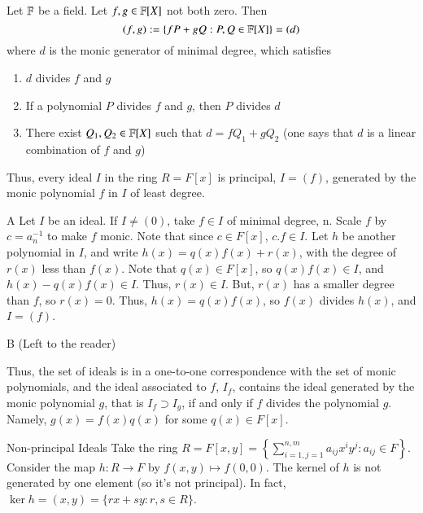 \documentclass[12pt, a4paper, twoside, openright, titlepage]{book}
\begin{document}
\begin{cor}{}{}
    Let $\mathbb F$ be a field. Let $f,g \in \mathbb F[X]$ not both zero. Then \begin{equation}
        (f,g) := \{fP+gQ: P,Q\in\mathbb F[X]\} = (d)
    \end{equation}
    where $d$ is the monic generator of minimal degree, which satisfies \begin{enumerate}
        \item $d$ divides $f$ and $g$
        \item If a polynomial $P$ divides $f$ and $g$, then $P$ divides $d$
        \item There exist $Q_1, Q_2 \in \mathbb F[X]$ such that $d = fQ_1 + gQ_2$ (one says that $d$ is a linear combination of $f$ and $g$)
    \end{enumerate}
    Thus, every ideal $I$ in the ring $R = F[x]$ is principal, $I = (f)$, generated by the monic polynomial $f$ in $I$ of least degree.
    \begin{prooflab*}{A}
        Let $I$ be an ideal. If $I \neq (0)$, take $f \in I$ of minimal degree, n. Scale $f$ by $c = a_n^{-1}$ to make $f$ monic. Note that since $c \in F[x]$, $c.f \in I$. Let $h$ be another polynomial in $I$, and write $h(x) = q(x)f(x) + r(x)$, with the degree of $r(x)$ less than $f(x)$. Note that $q(x) \in F[x]$, so $q(x)f(x) \in I$, and $h(x) - q(x)f(x) \in I$. Thus, $r(x) \in I$. But, $r(x)$ has a smaller degree than $f$, so $r(x) = 0$. Thus, $h(x) = q(x)f(x)$, so $f(x)$ divides $h(x)$, and $I = (f)$. 
    \end{prooflab*}
    \begin{prooflab*}{B}
        (Left to the reader)
    \end{prooflab*}
\end{cor}

\begin{rmk}{}{}
        Thus, the set of ideals is in a one-to-one correspondence with the set of monic polynomials, and the ideal associated to $f$, $I_f$, contains the ideal generated by the monic polynomial $g$, that is $I_f \supset I_g$, if and only if $f$ divides the polynomial $g$. Namely, $g(x)=f(x)q(x)$ for some $q(x) \in F[x]$. 
\end{rmk}

\begin{eg}{Non-principal Ideals}{}
        Take the ring $R = F[x,y] = \left\{\sum\limits_{i=1,j=1}^{n,m} a_{ij}x^iy^j:a_{ij} \in F\right\}$. Consider the map $h:R \rightarrow F$ by $f(x,y)\mapsto f(0,0)$. The kernel of $h$ is not generated by one element (so it's not principal). In fact, $\ker h = (x,y) = \{rx+sy:r,s \in R\}$.
\end{eg}
\end{document}
